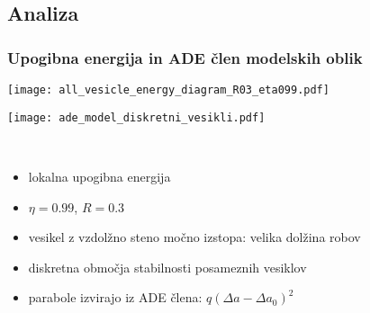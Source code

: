 \documentclass[slovene]{beamer}
\begin{document}
\subsection{Analiza}
\begin{frame}
\frametitle{Upogibna energija in ADE člen modelskih oblik}
	\begin{minipage}{0.5\textwidth}
  		\hspace{0cm}
  		\texttt{[image: all\_vesicle\_energy\_diagram\_R03\_eta099.pdf]}
	\end{minipage}%
	\begin{minipage}{0.5\textwidth}
		\hspace{0cm}
		\texttt{[image: ade\_model\_diskretni\_vesikli.pdf]}
	\end{minipage}\\
	\vspace{.3cm}
	\begin{minipage}{0.5\textwidth}
		\begin{itemize}
			\item lokalna upogibna energija
			\item $\eta=0.99$, $R=0.3$
			\item vesikel z vzdolžno steno močno izstopa: velika dolžina robov
		\end{itemize}
	\end{minipage}%
	\begin{minipage}{0.5\textwidth}
		\begin{itemize}
			\item diskretna območja stabilnosti posameznih vesiklov
			\item parabole izvirajo iz ADE člena: $q(\Delta a -\Delta a_0)^2$
		\end{itemize}
	\end{minipage}
\end{frame}
\end{document}
